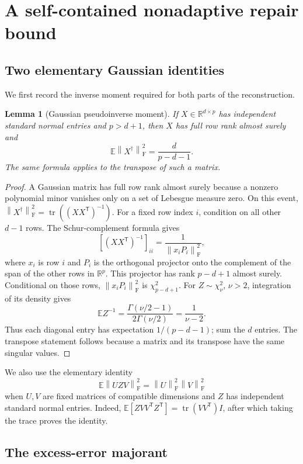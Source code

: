 \documentclass[11pt]{article}
\numberwithin{equation}{section}
\newtheorem{lemma}[theorem]{Lemma}
\theoremstyle{remark}
\newcommand{\R}{\mathbb R}
\newcommand{\E}{\mathbb E}
\newcommand{\tr}{\operatorname{tr}}
\newcommand{\norm}[1]{\left\lVert #1\right\rVert_{\mathrm F}}
\newcommand{\T}{\mathsf T}
\begin{document}
\section{A self-contained nonadaptive repair bound}\label{sec:repair}

\subsection{Two elementary Gaussian identities}
We first record the inverse moment required for both parts of the reconstruction.

\begin{lemma}[Gaussian pseudoinverse moment]\label{lem:inverse}
If $X\in\R^{d\times p}$ has independent standard normal entries and $p>d+1$, then $X$ has full row rank almost surely and
\begin{equation}\label{eq:inverse}
 \E\norm{X^\dagger}^2=\frac{d}{p-d-1}.
\end{equation}
The same formula applies to the transpose of such a matrix.
\end{lemma}
\begin{proof}
A Gaussian matrix has full row rank almost surely because a nonzero polynomial minor vanishes only on a set of Lebesgue measure zero. On this event,
$\norm{X^\dagger}^2=\tr((XX^\T)^{-1})$.
For a fixed row index $i$, condition on all other $d-1$ rows. The Schur-complement formula gives
\[
 [(XX^\T)^{-1}]_{ii}
 =\frac{1}{\norm{x_iP_i}^2},
\]
where $x_i$ is row $i$ and $P_i$ is the orthogonal projector onto the complement of the span of the other rows in $\R^p$. This projector has rank $p-d+1$ almost surely. Conditional on those rows, $\norm{x_iP_i}^2$ is $\chi^2_{p-d+1}$.
For $Z\sim\chi_\nu^2$, $\nu>2$, integration of its density gives
\[
 \E Z^{-1}
 =\frac{\Gamma(\nu/2-1)}{2\Gamma(\nu/2)}
 =\frac{1}{\nu-2}.
\]
Thus each diagonal entry has expectation $1/(p-d-1)$; sum the $d$ entries.
The transpose statement follows because a matrix and its transpose have the same singular values.
\end{proof}

We also use the elementary identity
\begin{equation}\label{eq:gaussproduct}
 \E\norm{UZV}^2=\norm U^2\norm V^2
\end{equation}
when $U,V$ are fixed matrices of compatible dimensions and $Z$ has independent standard normal entries. Indeed,
$\E[ZVV^\T Z^\T]=\tr(VV^\T)I$, after which taking the trace proves the identity.

\subsection{The excess-error majorant}
\end{document}
